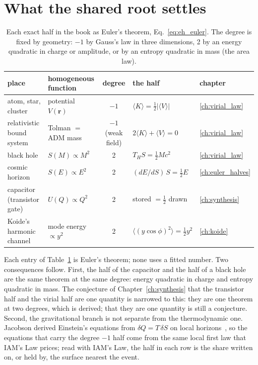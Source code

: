 \section{What the shared root settles}\label{sec:eh_settles}
\begin{table}[htbp]\centering\small
\caption{Each exact half in the book as Euler's theorem, Eq.~\eqref{eq:eh_euler}. The degree is fixed by geometry: $-1$ by Gauss's law in three
dimensions, 2 by an energy quadratic in charge or amplitude, or by an entropy quadratic in mass (the area law).}\label{tab:eh_halves}
\begin{tabular}{@{}llcll@{}}\toprule
place & homogeneous function & degree & the half & chapter\\\midrule
atom, star, cluster & potential $V(\mathbf r)$ & $-1$ & $\langle K\rangle=\tfrac12|\langle V\rangle|$ & \ref{ch:virial_law}\\
relativistic bound system & Tolman $=$ ADM mass & $-1$ (weak field) & $2\langle K\rangle+\langle V\rangle=0$ & \ref{ch:virial_law}\\
black hole & $S(M)\propto M^2$ & 2 & $T_HS=\tfrac12Mc^2$ & \ref{ch:virial_law}\\
cosmic horizon & $S(E)\propto E^2$ & 2 & $(dE/dS)\,S=\tfrac12E$ & \ref{ch:euler_halves}\\
capacitor (transistor gate) & $U(Q)\propto Q^2$ & 2 & stored $=\tfrac12$ drawn & \ref{ch:synthesis}\\
Koide's harmonic channel & mode energy $\propto y^2$ & 2 & $\langle(y\cos\phi)^2\rangle=\tfrac12y^2$ & \ref{ch:koide}\\\bottomrule
\end{tabular}
\end{table}
Each entry of Table~\ref{tab:eh_halves} is Euler's theorem; none uses a fitted number. \derived{} Two consequences follow. First, the half of the
capacitor and the half of a black hole are the same theorem at the same degree: energy quadratic in charge and entropy quadratic in mass. The
conjecture of Chapter~\ref{ch:synthesis} that the transistor half and the virial half are one quantity is narrowed to this: they are one theorem
at two degrees, which is derived; that they are one quantity is still a conjecture. \conjecture{} Second, the gravitational branch is not separate
from the thermodynamic one. Jacobson derived Einstein's equations from $\delta Q=T\,\delta S$ on local horizons~\cite{Jacobson1995}, so the
equations that carry the degree $-1$ half come from the same local first law that IAM's Law prices; read with IAM's Law, the half in each row is the
share written on, or held by, the surface nearest the event. \interp

